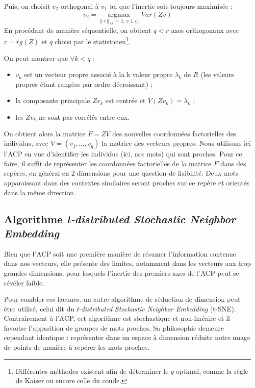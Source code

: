 \documentclass[11pt,french,french]{article}
\providecommand{\tightlist}{%
  \setlength{\parskip}{0pt}
  }
\let\rmarkdownfootnote\footnote%
\def\footnote{\protect\rmarkdownfootnote}
\begin{document}
Puis, on choisit \(v_2\) orthogonal à \(v_1\) tel que l'inertie soit toujours maximisée :
\[
v_2 =\underset{ \| v \|_M = 1,\,v \perp v_1}{\mathrm{argmax}}\;  Var(Zv)
\]
En procédant de manière séquentielle, on obtient \(q < r\) axes orthogonaux avec \(r = rg(Z)\) et \(q\) choisi par le statisticien\footnote{Différentes méthodes existent afin de déterminer le \(q\) optimal, comme la règle de Kaiser ou encore celle du coude.}.

On peut montrer que \(\forall k < q\) :

\begin{itemize}
\tightlist
\item
  \(v_k\) est un vecteur propre associé à la k\ieme{} valeur propre \(\lambda_k\) de \(R\) (les valeurs propres étant rangées par ordre décroissant) ;
\item
  la composante principale \(Zv_k\) est centrée et \(V(Zv_k)= \lambda_k\) ;
\item
  les \(Zv_k\) ne sont pas corrélés entre eux.
\end{itemize}

On obtient alors la matrice \(F = ZV\) des nouvelles coordonnées factorielles des individus, avec \(V = (v_1,\dots,v_q)\) la matrice des vecteurs propres.
Nous utilisons ici l'ACP en vue d'identifier les individus (ici, nos mots) qui sont proches. Pour ce faire, il suffit de représenter les coordonnées factorielles de la matrice \(F\) dans des repères, en général en 2 dimensions pour une question de lisibilité. Deux mots apparaissant dans des contextes similaires seront proches sur ce repère et orientés dans la même direction.

\hypertarget{algorithme-t-distributed-stochastic-neighbor-embedding}{%
\subsection{\texorpdfstring{Algorithme \emph{t-distributed Stochastic Neighbor Embedding}}{Algorithme t-distributed Stochastic Neighbor Embedding}}\label{algorithme-t-distributed-stochastic-neighbor-embedding}}

Bien que l'ACP soit une première manière de résumer l'information contenue dans nos vecteurs, elle présente des limites, notamment dans les vecteurs aux trop grandes dimensions, pour lesquels l'inertie des premiers axes de l'ACP peut se révéler faible.

Pour combler ces lacunes, un autre algorithme de réduction de dimension peut être utilisé, celui dit du \emph{t-distributed Stochastic Neighbor Embedding} (t-SNE).
Contrairement à l'ACP, cet algorithme est stochastique et non-linéaire et il favorise l'apparition de groupes de mots proches.
Sa philosophie demeure cependant identique : représenter dans un espace à dimension réduite notre nuage de points de manière à repérer les mots proches.
\end{document}
